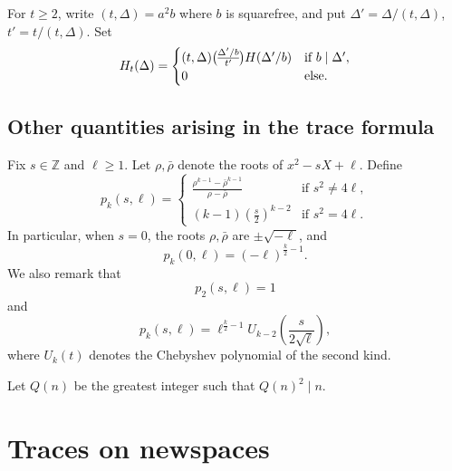 \documentclass[11pt]{amsart}
\newcommand{\Z}{\mathbb Z}
\newcommand{\leg}{\overwithdelims ()}
\numberwithin{lem}{section}
\theoremstyle{remark}
\theoremstyle{definition}
\numberwithin{equation}{section}
\begin{document}
For $t \ge 2$, write $(t,\Delta) = a^2 b$ where $b$ is squarefree, and put $\Delta' = \Delta/(t,\Delta)$, $t' = t/(t,\Delta)$.  Set
\[ H_t(\Delta) =
\begin{cases} (t,\Delta) {\Delta'/b \leg t'} H(\Delta'/b) & \text{if } b \mid \Delta', \\
0 & \text{else}.
\end{cases} \]


\subsection{Other quantities arising in the trace formula}
Fix $s \in \Z$ and $\ell \ge 1$.  Let $\rho, \bar \rho$ denote the roots of $x^2 - s X + \ell$.  Define
\[ p_k(s,\ell) =
\begin{cases}
\frac{\rho^{k-1} - \bar \rho^{k-1}}{\rho - \bar \rho} & \text{if }s^2 \ne 4 \ell, \\
(k-1) ( \frac s 2 )^{k-2} &\text{if } s^2 = 4 \ell.
\end{cases} \]
In particular, when $s=0$, the roots $\rho, \bar \rho$ are $\pm \sqrt{-\ell}$, and 
\[ p_k(0,\ell) = (-\ell)^{\frac k2 - 1}. \]
We also remark that
\[ p_2(s,\ell) = 1 \]
and
\[ p_k(s, \ell) = \ell^{\frac k2 - 1} U_{k-2}(\frac s{2 \sqrt \ell}) , \] 
where $U_k(t)$ denotes the Chebyshev polynomial of the second kind.

Let $Q(n)$ be the greatest integer such that $Q(n)^2 \mid n$.



\section{Traces on newspaces} \label{sec:tnew}
\end{document}
